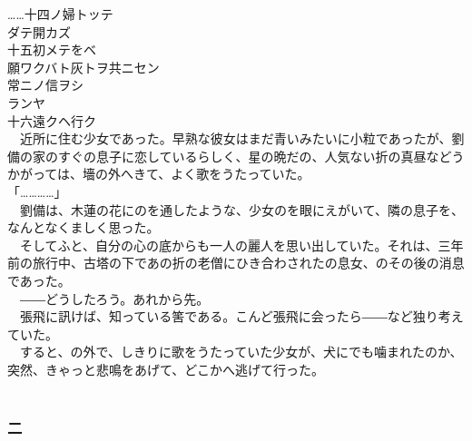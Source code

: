 \documentclass[
  paper=a5,
  fontsize=10pt,
  jafontsize=9.5pt,
  tate,                  %
  open_bracket_pos=nibu, %
]{jlreq}
\begin{document}
……十四ノ婦トッテ\\

ダテ開カズ\\


十五初メテをベ\\


願ワクバト灰トヲ共ニセン\\


常ニノ信ヲシ\\

ランヤ\\


十六遠クヘ行ク\\



　近所に住む少女であった。早熟な彼女はまだ青いみたいに小粒であったが、劉備の家のすぐの息子に恋しているらしく、星の晩だの、人気ない折の真昼などうかがっては、墻の外へきて、よく歌をうたっていた。\\


「…………」\\


　劉備は、木蓮の花にのを通したような、少女のを眼にえがいて、隣の息子を、なんとなくましく思った。\\


　そしてふと、自分の心の底からも一人の麗人を思い出していた。それは、三年前の旅行中、古塔の下であの折の老僧にひき合わされたの息女、のその後の消息であった。\\


　――どうしたろう。あれから先。\\


　張飛に訊けば、知っている筈である。こんど張飛に会ったら――など独り考えていた。\\


　すると、の外で、しきりに歌をうたっていた少女が、犬にでも噛まれたのか、突然、きゃっと悲鳴をあげて、どこかへ逃げて行った。\\

\\

\subsubsection{二}
\end{document}
